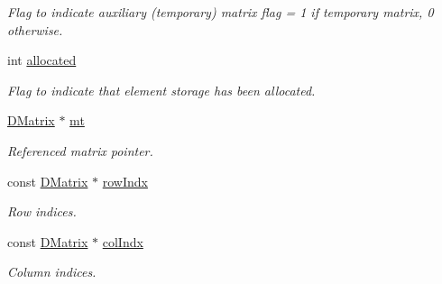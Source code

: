 \begin{DoxyCompactItemize}
\begin{DoxyCompactList}\small\item\em Flag to indicate auxiliary (temporary) matrix flag = 1 if temporary matrix, 0 otherwise. \item\end{DoxyCompactList}\item 
\hypertarget{classDMatrix_ae25aeefd7343fa1c4e2af40b58ea6417}{
int \hyperlink{classDMatrix_ae25aeefd7343fa1c4e2af40b58ea6417}{allocated}}
\label{classDMatrix_ae25aeefd7343fa1c4e2af40b58ea6417}

\begin{DoxyCompactList}\small\item\em Flag to indicate that element storage has been allocated. \item\end{DoxyCompactList}\item 
\hypertarget{classDMatrix_aeac61a503c71ccb91ed1716b2783929b}{
\hyperlink{classDMatrix}{DMatrix} $\ast$ \hyperlink{classDMatrix_aeac61a503c71ccb91ed1716b2783929b}{mt}}
\label{classDMatrix_aeac61a503c71ccb91ed1716b2783929b}

\begin{DoxyCompactList}\small\item\em Referenced matrix pointer. \item\end{DoxyCompactList}\item 
\hypertarget{classDMatrix_a65ac7d1345a971d77e67ee703c2a2810}{
const \hyperlink{classDMatrix}{DMatrix} $\ast$ \hyperlink{classDMatrix_a65ac7d1345a971d77e67ee703c2a2810}{rowIndx}}
\label{classDMatrix_a65ac7d1345a971d77e67ee703c2a2810}

\begin{DoxyCompactList}\small\item\em Row indices. \item\end{DoxyCompactList}\item 
\hypertarget{classDMatrix_a07458d7c2b1b8de8e8c999b9599f4b8b}{
const \hyperlink{classDMatrix}{DMatrix} $\ast$ \hyperlink{classDMatrix_a07458d7c2b1b8de8e8c999b9599f4b8b}{colIndx}}
\label{classDMatrix_a07458d7c2b1b8de8e8c999b9599f4b8b}

\begin{DoxyCompactList}\small\item\em Column indices. \item\end{DoxyCompactList}\end{DoxyCompactItemize}

